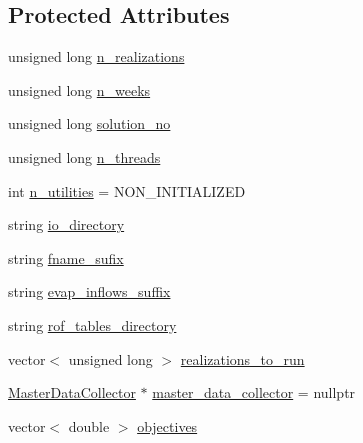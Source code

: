 \subsection*{Protected Attributes}
\begin{DoxyCompactItemize}
\item 
unsigned long \mbox{\hyperlink{classProblem_a270a5672643bfe09e52e0f24e1884136_a270a5672643bfe09e52e0f24e1884136}{n\+\_\+realizations}}
\item 
unsigned long \mbox{\hyperlink{classProblem_ac7513bb0ecdfa4bbb7d2ada3595d71ec_ac7513bb0ecdfa4bbb7d2ada3595d71ec}{n\+\_\+weeks}}
\item 
unsigned long \mbox{\hyperlink{classProblem_a7ca15cdcbff926ddca25bdee5984ffe5_a7ca15cdcbff926ddca25bdee5984ffe5}{solution\+\_\+no}}
\item 
unsigned long \mbox{\hyperlink{classProblem_a3303a162d648e8ae16153b57b5b4054f_a3303a162d648e8ae16153b57b5b4054f}{n\+\_\+threads}}
\item 
int \mbox{\hyperlink{classProblem_a4ca86ba2f568d232cf0421d39acff113_a4ca86ba2f568d232cf0421d39acff113}{n\+\_\+utilities}} = N\+O\+N\+\_\+\+I\+N\+I\+T\+I\+A\+L\+I\+Z\+ED
\item 
string \mbox{\hyperlink{classProblem_ac58848a0d808cf040c3fb3676b4a236f_ac58848a0d808cf040c3fb3676b4a236f}{io\+\_\+directory}}
\item 
string \mbox{\hyperlink{classProblem_a59444139a907aaf4c6159caed46c8118_a59444139a907aaf4c6159caed46c8118}{fname\+\_\+sufix}}
\item 
string \mbox{\hyperlink{classProblem_a1ff3958eef8bfb851a84ce0772104dca_a1ff3958eef8bfb851a84ce0772104dca}{evap\+\_\+inflows\+\_\+suffix}}
\item 
string \mbox{\hyperlink{classProblem_abc641b49a4defb0dbabafbf3f9dbca6e_abc641b49a4defb0dbabafbf3f9dbca6e}{rof\+\_\+tables\+\_\+directory}}
\item 
vector$<$ unsigned long $>$ \mbox{\hyperlink{classProblem_af9ed9265d0d2b4918bd468d717429de1_af9ed9265d0d2b4918bd468d717429de1}{realizations\+\_\+to\+\_\+run}}
\item 
\mbox{\hyperlink{classMasterDataCollector}{Master\+Data\+Collector}} $\ast$ \mbox{\hyperlink{classProblem_a6cd1db1d587a449985d6514390ba8c96_a6cd1db1d587a449985d6514390ba8c96}{master\+\_\+data\+\_\+collector}} = nullptr
\item 
vector$<$ double $>$ \mbox{\hyperlink{classProblem_a72750ee8c8117f5ee9b190a359d6a60d_a72750ee8c8117f5ee9b190a359d6a60d}{objectives}}
\item 

\end{DoxyCompactItemize}
